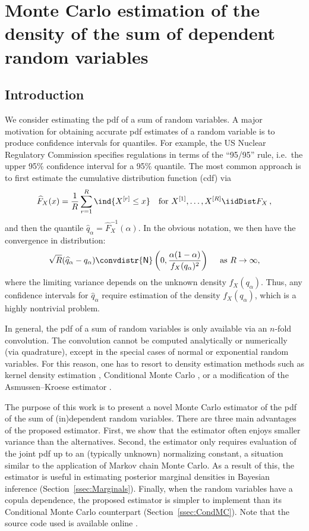 \chapter{Monte Carlo estimation of the density of the sum of dependent random variables} \label{chp:Pushout}

\section{Introduction}

We consider estimating the pdf of a sum of random variables. A major motivation for obtaining accurate pdf estimates of a random variable is to produce confidence intervals for quantiles. For example, the US Nuclear Regulatory Commission specifies regulations in terms of the ``95/95'' rule, i.e.\ the upper 95\% confidence interval for a 95\% quantile.  The most common approach  \cite{asmussen2017conditional}  is to first  estimate the cumulative distribution function (cdf) via
\[ \widehat{F}_X(x) = \frac1R \sum_{r=1}^R \ind{ X^{[r]} \le x} \quad \text{for } X^{[1]}, \dots, X^{[R]} \iidDist F_X \,, \]
and then the quantile  $\widehat{q}_\alpha=\widehat{F}_X^{-1}(\alpha)$. In the obvious notation, we then have the convergence in distribution:
\[
\sqrt{R} (\widehat{q}_\alpha - q_\alpha) \convdistr {\sf N}\left(0, \frac{\alpha(1-\alpha)}{f_X(q_\alpha)^2}\right)  \quad \text{ as } R \to \infty,
\]
where the limiting variance depends on the unknown density $f_X(q_\alpha)$.  Thus, any confidence intervals for $\widehat{q}_\alpha$ require estimation of the density $f_X(q_\alpha)$, which is a highly nontrivial problem.

In general, the pdf of a sum of random variables is only available via an $n$-fold convolution.
The convolution  cannot be computed analytically  or numerically (via quadrature), except in the special cases of normal or exponential random variables. For this reason, one has to resort to density estimation methods such as kernel density estimation \cite{botev2010kernel}, Conditional Monte Carlo \cite{asmussen2017conditional}, or a modification of the Asmussen--Kroese estimator \cite{asmussen2006improved}.

The purpose of this work is to  present a novel Monte Carlo estimator of the pdf of the sum of (in)dependent  random variables. There are three main  advantages of the proposed estimator. First,
we show that the estimator often enjoys smaller variance than the alternatives.
Second,  the estimator only requires  evaluation of   the joint pdf up
to an (typically unknown) normalizing constant, a situation similar to the application of Markov chain Monte Carlo. As a result of this, the estimator is useful in estimating posterior marginal densities in Bayesian inference (Section~\ref{ssec:Marginals}).  Finally, when the random variables have a copula dependence, the proposed estimator is simpler to implement than its Conditional Monte Carlo counterpart (Section~\ref{ssec:CondMC}).
Note that the source code used is available online \cite{PushoutCode}.

